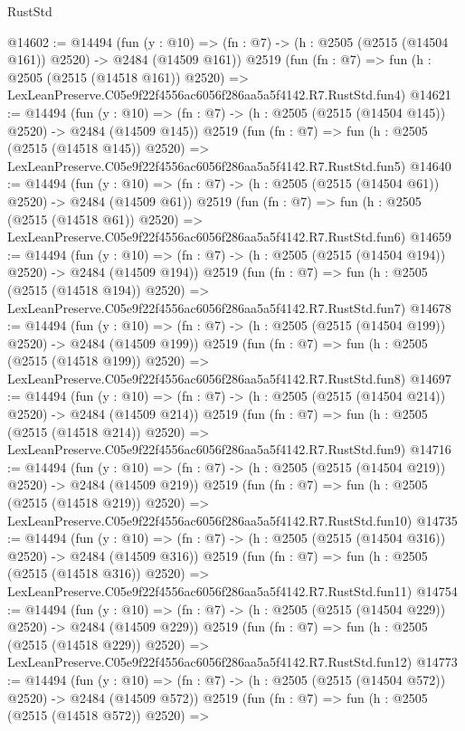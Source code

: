 \begin{lexlean}{RustStd}
\begin{coremodule}
@14602 := @14494
    (fun (y : @10) => (fn : @7) -> (h : @2505 (@2515 (@14504 @161)) @2520) -> @2484 (@14509 @161))
    @2519
    (fun (fn : @7) =>
    fun (h : @2505 (@2515 (@14518 @161)) @2520) =>
    LexLeanPreserve.C05e9f22f4556ac6056f286aa5a5f4142.R7.RustStd.fun4)
@14621 := @14494
    (fun (y : @10) => (fn : @7) -> (h : @2505 (@2515 (@14504 @145)) @2520) -> @2484 (@14509 @145))
    @2519
    (fun (fn : @7) =>
    fun (h : @2505 (@2515 (@14518 @145)) @2520) =>
    LexLeanPreserve.C05e9f22f4556ac6056f286aa5a5f4142.R7.RustStd.fun5)
@14640 := @14494
    (fun (y : @10) => (fn : @7) -> (h : @2505 (@2515 (@14504 @61)) @2520) -> @2484 (@14509 @61))
    @2519
    (fun (fn : @7) =>
    fun (h : @2505 (@2515 (@14518 @61)) @2520) =>
    LexLeanPreserve.C05e9f22f4556ac6056f286aa5a5f4142.R7.RustStd.fun6)
@14659 := @14494
    (fun (y : @10) => (fn : @7) -> (h : @2505 (@2515 (@14504 @194)) @2520) -> @2484 (@14509 @194))
    @2519
    (fun (fn : @7) =>
    fun (h : @2505 (@2515 (@14518 @194)) @2520) =>
    LexLeanPreserve.C05e9f22f4556ac6056f286aa5a5f4142.R7.RustStd.fun7)
@14678 := @14494
    (fun (y : @10) => (fn : @7) -> (h : @2505 (@2515 (@14504 @199)) @2520) -> @2484 (@14509 @199))
    @2519
    (fun (fn : @7) =>
    fun (h : @2505 (@2515 (@14518 @199)) @2520) =>
    LexLeanPreserve.C05e9f22f4556ac6056f286aa5a5f4142.R7.RustStd.fun8)
@14697 := @14494
    (fun (y : @10) => (fn : @7) -> (h : @2505 (@2515 (@14504 @214)) @2520) -> @2484 (@14509 @214))
    @2519
    (fun (fn : @7) =>
    fun (h : @2505 (@2515 (@14518 @214)) @2520) =>
    LexLeanPreserve.C05e9f22f4556ac6056f286aa5a5f4142.R7.RustStd.fun9)
@14716 := @14494
    (fun (y : @10) => (fn : @7) -> (h : @2505 (@2515 (@14504 @219)) @2520) -> @2484 (@14509 @219))
    @2519
    (fun (fn : @7) =>
    fun (h : @2505 (@2515 (@14518 @219)) @2520) =>
    LexLeanPreserve.C05e9f22f4556ac6056f286aa5a5f4142.R7.RustStd.fun10)
@14735 := @14494
    (fun (y : @10) => (fn : @7) -> (h : @2505 (@2515 (@14504 @316)) @2520) -> @2484 (@14509 @316))
    @2519
    (fun (fn : @7) =>
    fun (h : @2505 (@2515 (@14518 @316)) @2520) =>
    LexLeanPreserve.C05e9f22f4556ac6056f286aa5a5f4142.R7.RustStd.fun11)
@14754 := @14494
    (fun (y : @10) => (fn : @7) -> (h : @2505 (@2515 (@14504 @229)) @2520) -> @2484 (@14509 @229))
    @2519
    (fun (fn : @7) =>
    fun (h : @2505 (@2515 (@14518 @229)) @2520) =>
    LexLeanPreserve.C05e9f22f4556ac6056f286aa5a5f4142.R7.RustStd.fun12)
@14773 := @14494
    (fun (y : @10) => (fn : @7) -> (h : @2505 (@2515 (@14504 @572)) @2520) -> @2484 (@14509 @572))
    @2519
    (fun (fn : @7) =>
    fun (h : @2505 (@2515 (@14518 @572)) @2520) =>

\end{coremodule}
\end{lexlean}
